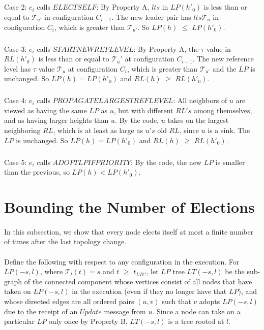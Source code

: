 \subparagraph{}Case 2: $e_i$ calls $ELECTSELF$: By Property A, $lts$ in $LP(h'_0 )$ is less than or equal to $\mathcal{T} _{u'}$ in configuration $C_{i-1}$. The new leader pair has $lts \mathcal{T} _u$ in configuration $C_i$, which is greater than $\mathcal{T} _{u'}$. So $LP(h)$ $\leq$ $LP(h'_0 )$.
\subparagraph{}Case 3: $e_i$ calls $STARTNEWREFLEVEL$: By Property A, the $\tau$ value in $RL(h'_0 )$ is less than or equal to $\mathcal{T}_u'$ at configuration $C_{i-1}$. The new reference level has $\tau$ value $\mathcal{T}_u$ at configuration $C_i$, which is greater than $\mathcal{T}_{u'}$ and the $LP$ is unchanged. So $LP(h) = LP(h'_0 )$ and $RL(h)$ $\geq$ $RL(h'_0 )$.
\subparagraph{}Case 4: $e_i$ calls $PROPAGATELARGESTREFLEVEL$: All neighbors of $u$ are viewed as having the same $LP$ as $u$, but with different $RL's$ among themselves, and as having larger heights than $u$. By the code, $u$ takes on the largest neighboring $RL$, which is at least as large as $u's$ old $RL$, since $u$ is a sink. The $LP$ is unchanged. So $LP(h) = LP(h'_0 )$ and $RL(h)$ $\geq$ $RL(h'_0 )$.
\subparagraph{}Case 5: $e_i$ calls $ADOPTLPIFPRIORITY$: By the code, the new $LP$ is smaller than the previous, so $LP(h) < LP(h'_0 )$.
\section{Bounding the Number of Elections}
\paragraph{}In this subsection, we show that every node elects itself at most a finite number of times after the last topology change.
\paragraph{}Define the following with respect to any configuration in the execution. For $LP (-s, l)$, where $\mathcal{T}_l (t) = s$ and $t$ $\geq$ $t_{LTC}$, let $LP$ tree $LT (-s, l)$ be the sub-graph of the connected component whose vertices consist of all nodes that have taken on $LP (-s, l)$ in the execution (even if they no longer have that $LP$), and whose directed edges are all ordered pairs $(u, v)$ such that $v$ adopts $LP (-s, l)$ due to the receipt of an $Update$ message from $u$. Since a node can take on a particular $LP$ only once by Property B, $LT (-s, l)$ is a tree rooted at $l$.
